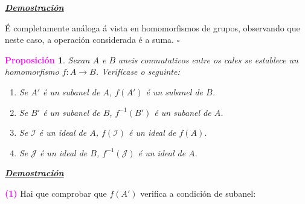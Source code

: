 \documentclass[twoside]{report}
\newcommand{\magbf}[1]{\textcolor{magenta}{\textbf{#1}}} %
\theoremstyle{mystyle}
\newtheorem{prop}{\magbf{Proposición}}[chapter]
\newenvironment{proposition}
{\begin{mdframed}[linecolor = magenta,backgroundcolor = classicrose, linewidth = 2mm]\begin{prop}}
{\end{prop}\end{mdframed}}
\begin{document}
\vspace{2mm}

\noindent \textbf{\textit{\underline{Demostración}}}

\vspace{2mm}

\noindent É completamente análoga á vista en homomorfismos de grupos, observando que neste caso, a operación considerada é a suma. $\square$\\

\begin{proposition} \label{prop2.11}
Sexan $A$ e $B$ aneis conmutativos entre os cales se establece un homomorfismo $f: A \longrightarrow B$. Verifícase o seguinte:
\begin{enumerate}
    \item Se $A'$ é un subanel de $A$, $f(A')$ é un subanel de $B$.
    \item Se $B'$ é un subanel de $B$, $f^{-1}(B')$ é un subanel de $A$.
    \item Se $\mathcal{I}$ é un ideal de $A$, $f(\mathcal{I})$ é un ideal de $f(A)$.
    \item Se $\mathcal{J}$ é un ideal de $B$, $f^{-1}(\mathcal{J})$ é un ideal de $A$.
\end{enumerate}
\end{proposition}

\vspace{2mm}

\noindent \textbf{\textit{\underline{Demostración}}}

\vspace{2mm}

\noindent \magbf{(1)} Hai que comprobar que $f(A')$ verifica a condición de subanel:
\end{document}
